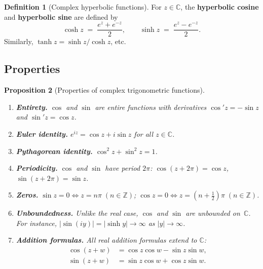 \documentclass[12pt,a4paper,openany]{book}
\theoremstyle{definition}
\newtheorem{definition}{Definition}[chapter]
\theoremstyle{plain}
\newtheorem{proposition}[definition]{Proposition}
\theoremstyle{remark}
\newcommand{\C}{\mathbb{C}}
\newcommand{\Z}{\mathbb{Z}}
\newcommand{\abs}[1]{\left|#1\right|}
\begin{document}
\begin{definition}[Complex hyperbolic functions]\label{def:complex-hyp}
For $z\in\C$, the \textbf{hyperbolic cosine} and
\textbf{hyperbolic sine} are defined by
\[
  \cosh z \;=\; \frac{e^z+e^{-z}}{2}, \qquad
  \sinh z \;=\; \frac{e^z-e^{-z}}{2}.
\]
Similarly, $\tanh z = \sinh z/\cosh z$, etc.
\end{definition}

\subsection{Properties}

\begin{proposition}[Properties of complex trigonometric functions]%
\label{prop:trig-properties}
\leavevmode
\begin{enumerate}[label=\textup{(\roman*)}]
  \item \textbf{Entirety.} $\cos$ and $\sin$ are entire functions with
    derivatives $\cos' z = -\sin z$ and $\sin' z = \cos z$.
  \item \textbf{Euler identity.} $e^{iz} = \cos z + i\sin z$ for all $z\in\C$.
  \item \textbf{Pythagorean identity.} $\cos^2 z + \sin^2 z = 1$.
  \item \textbf{Periodicity.} $\cos$ and $\sin$ have period $2\pi$:
    $\cos(z+2\pi)=\cos z$, $\sin(z+2\pi)=\sin z$.
  \item \textbf{Zeros.} $\sin z = 0 \iff z = n\pi\;(n\in\Z)$;
    $\cos z = 0 \iff z = (n+\tfrac{1}{2})\pi\;(n\in\Z)$.
  \item \textbf{Unboundedness.} Unlike the real case, $\cos$ and $\sin$ are
    unbounded on~$\C$.  For instance,
    $\abs{\sin(iy)} = \abs{\sinh y}\to\infty$ as $\abs{y}\to\infty$.
  \item \textbf{Addition formulas.} All real addition formulas extend to $\C$:
    \begin{align*}
      \cos(z+w) &= \cos z\cos w - \sin z\sin w, \\
      \sin(z+w) &= \sin z\cos w + \cos z\sin w.
    \end{align*}
\end{enumerate}
\end{proposition}
\end{document}
